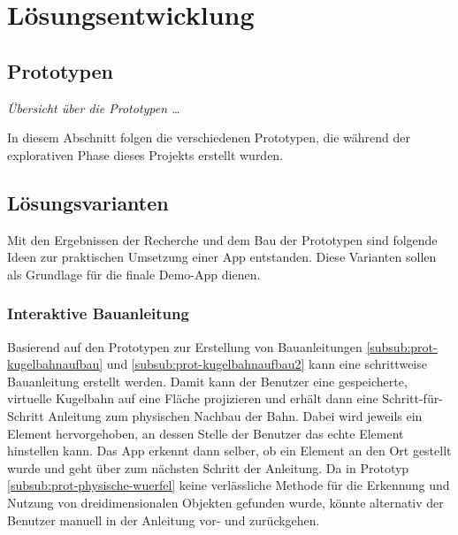 \section{Lösungsentwicklung}

\subsection{Prototypen}
\textit{Übersicht über die Prototypen …} %

In diesem Abschnitt folgen die verschiedenen Prototypen, die während der explorativen Phase dieses Projekts erstellt wurden.









\subsection{Lösungsvarianten}

Mit den Ergebnissen der Recherche und dem Bau der Prototypen sind folgende Ideen zur praktischen Umsetzung einer App entstanden.
Diese Varianten sollen als Grundlage für die finale Demo-App dienen.

\subsubsection{Interaktive Bauanleitung}\label{subsub:loesung-bauanleitung}

Basierend auf den Prototypen zur Erstellung von Bauanleitungen \ref{subsub:prot-kugelbahnaufbau} und \ref{subsub:prot-kugelbahnaufbau2} kann eine schrittweise Bauanleitung erstellt werden.
Damit kann der Benutzer eine gespeicherte, virtuelle Kugelbahn auf eine Fläche projizieren und erhält dann eine Schritt-für-Schritt Anleitung zum physischen Nachbau der Bahn.
Dabei wird jeweils ein Element hervorgehoben, an dessen Stelle der Benutzer das echte Element hinstellen kann.
Das App erkennt dann selber, ob ein Element an den Ort gestellt wurde und geht über zum nächsten Schritt der Anleitung.
Da in Prototyp \ref{subsub:prot-physische-wuerfel} keine verlässliche Methode für die Erkennung und Nutzung von dreidimensionalen Objekten gefunden wurde, könnte alternativ der Benutzer manuell in der Anleitung vor- und zurückgehen.

